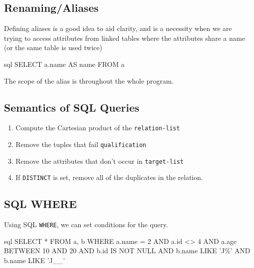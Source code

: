 \subsection{Renaming/Aliases}\label{sub:renaming_aliases}

Defining aliases is a good idea to aid clarity, and is a necessity when we are trying to access attributes from linked tables where the attributes share a name (or the same table is used twice)
\begin{code}{sql}
    SELECT a.name AS name
    FROM a
\end{code}
\begin{note}
    The scope of the alias is throughout the whole program.
\end{note}

\subsection{Semantics of SQL Queries}\label{sub:semantics_of_sql_queries}

\begin{enumerate}
    \item Compute the Cartesian product of the \texttt{relation-list}
    \item Remove the tuples that fail \texttt{qualification}
    \item Remove the attributes that don't occur in \texttt{target-list}
    \item If \texttt{DISTINCT} is set, remove all of the duplicates in the relation.
\end{enumerate}

\subsection{SQL WHERE}\label{sub:wheredsrseven}

Using SQL \texttt{WHERE}, we can set conditions for the query.
\begin{code}{sql}
    SELECT *
    FROM a, b
    WHERE a.name = 2
        AND a.id <> 4
        AND a.age BETWEEN 10 AND 20
        AND b.id IS NOT NULL
        AND b.name LIKE 'J\%'
        AND b.name LIKE 'J__'
\end{code}

